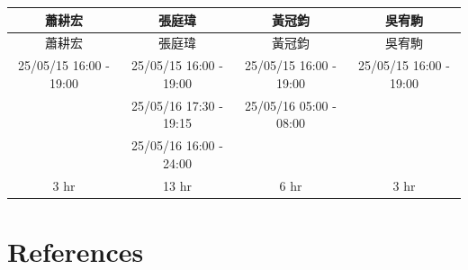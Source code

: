 \documentclass[12pt]{article}
\begin{document}
    \begin{CJK*}{UTF8}{bsmi}
        \begin{longtable}{c|c|c|c|}
            \hline
            蕭耕宏 & 張庭瑋 & 黃冠鈞 & 吳宥駒 \\
            \hline
            \endfirsthead
            \hline
            蕭耕宏 & 張庭瑋 & 黃冠鈞 & 吳宥駒 \\
            \hline
            \endhead
            \hline
            25/05/15 16:00 - 19:00 & 25/05/15 16:00 - 19:00 & 25/05/15 16:00 - 19:00 & 25/05/15 16:00 - 19:00 \\
            \hline
            & 25/05/16 17:30 - 19:15 & 25/05/16 05:00 - 08:00 &                        \\
            \hline
            & 25/05/16 16:00 - 24:00 &                        &                        \\
            \hline
            3 hr                   & 13 hr                  & 6 hr                   & 3 hr                   \\
            \hline
        \end{longtable}
    \end{CJK*}



    \section*{References}

    \nocite{Siepe2024}
    \printbibliography[heading=none]
\end{document}
